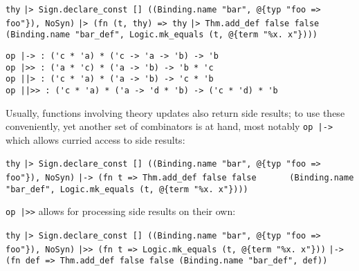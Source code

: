 \begin{isabellebody}
\begin{isamarkuptext}
  \smallskip\begin{mldecls}
\verb|thy|\isasep\isanewline%
\verb||\verb,|,\verb|> Sign.declare_const [] ((Binding.name "bar", @{typ "foo => foo"}), NoSyn)|\isasep\isanewline%
\verb||\verb,|,\verb|> (fn (t, thy) => thy|\isasep\isanewline%
\verb||\verb,|,\verb|> Thm.add_def false false|\isasep\isanewline%
\verb|     (Binding.name "bar_def", Logic.mk_equals (t, @{term "%x. x"})))|
  \end{mldecls}%
\end{isamarkuptext}%
\isamarkuptrue%
%
\isadelimmlref
%
\endisadelimmlref
%
\isatagmlref
%
\begin{isamarkuptext}%
\begin{mldecls}
  \verb|op |\verb,|,\verb|-> : ('c * 'a) * ('c -> 'a -> 'b) -> 'b| \\
  \verb|op |\verb,|,\verb|>> : ('a * 'c) * ('a -> 'b) -> 'b * 'c| \\
  \verb|op |\verb,|,\verb||\verb,|,\verb|> : ('c * 'a) * ('a -> 'b) -> 'c * 'b| \\
  \verb|op |\verb,|,\verb||\verb,|,\verb|>> : ('c * 'a) * ('a -> 'd * 'b) -> ('c * 'd) * 'b| \\
  \end{mldecls}%
\end{isamarkuptext}%
\isamarkuptrue%
%
\endisatagmlref
{\isafoldmlref}%
%
\isadelimmlref
%
\endisadelimmlref
%
\begin{isamarkuptext}%
\noindent Usually, functions involving theory updates also return
  side results; to use these conveniently, yet another
  set of combinators is at hand, most notably \verb|op |\verb,|,\verb|->|
  which allows curried access to side results:

  \smallskip\begin{mldecls}
\verb|thy|\isasep\isanewline%
\verb||\verb,|,\verb|> Sign.declare_const [] ((Binding.name "bar", @{typ "foo => foo"}), NoSyn)|\isasep\isanewline%
\verb||\verb,|,\verb|-> (fn t => Thm.add_def false false|\isasep\isanewline%
\verb|      (Binding.name "bar_def", Logic.mk_equals (t, @{term "%x. x"})))|\isasep\isanewline%

  \end{mldecls}

  \noindent \verb|op |\verb,|,\verb|>>| allows for processing side results on their own:

  \smallskip\begin{mldecls}
\verb|thy|\isasep\isanewline%
\verb||\verb,|,\verb|> Sign.declare_const [] ((Binding.name "bar", @{typ "foo => foo"}), NoSyn)|\isasep\isanewline%
\verb||\verb,|,\verb|>> (fn t => Logic.mk_equals (t, @{term "%x. x"}))|\isasep\isanewline%
\verb||\verb,|,\verb|-> (fn def => Thm.add_def false false (Binding.name "bar_def", def))|\isasep\isanewline%


\end{mldecls}
\end{isamarkuptext}
\end{isabellebody}
